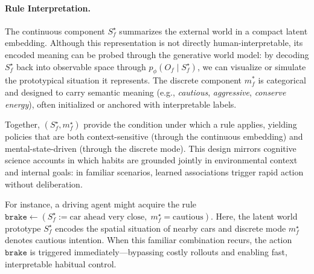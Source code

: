\documentclass{article} %
\begin{document}
\paragraph{Rule Interpretation.} The continuous component $S_f^\star$ summarizes the external world in a compact latent embedding. 
Although this representation is not directly human-interpretable, its encoded meaning can be probed 
through the generative world model: by decoding $S_f^\star$ back into observable space through $p_\phi(O_f \mid S_f^\star)$, we can visualize 
or simulate the prototypical situation it represents. The discrete component $m_f^*$ is categorical 
and designed to carry semantic meaning (e.g., \emph{cautious}, \emph{aggressive}, \emph{conserve energy}), 
often initialized or anchored with interpretable labels.  

Together, $(S_f^\star, m_f^\star)$ provide the condition under which a rule applies, yielding policies that 
are both context-sensitive (through the continuous embedding) and mental-state-driven (through the 
discrete mode). This design mirrors cognitive science accounts in which habits are grounded jointly in 
environmental context and internal goals: in familiar scenarios, learned associations trigger rapid action 
without deliberation.  

For instance, a driving agent might acquire the rule
$
\texttt{brake} \gets (S_f^\star:= \text{car ahead very close}, \; m_f^\star = \text{cautious}).
$
Here, the latent world prototype $S_f^\star$ encodes the spatial situation of nearby cars and 
discrete mode $m_f^\star$ denotes cautious intention. When this familiar combination recurs, the 
action $\texttt{brake}$ is triggered immediately—bypassing costly rollouts and enabling fast, interpretable 
habitual control.
\end{document}
